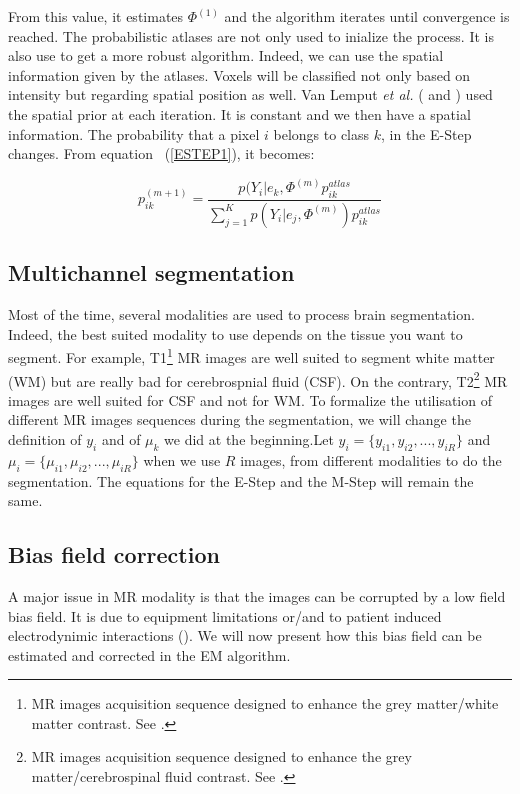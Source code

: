 From this value, it estimates $\Phi^{(1)}$ and the algorithm iterates until convergence is reached. The probabilistic atlases are not only used to inialize the process. It is also use to get a more robust algorithm. Indeed, we can use the spatial information given by the atlases. Voxels will be classified not only based on intensity but regarding spatial position as well. Van Lemput \textit{et al.} (\cite{8} and \cite{9}) used the spatial prior at each iteration. It is constant and we then have a spatial information. The probability that a pixel $i$ belongs to class $k$, in the E-Step changes. From equation ~(\ref{ESTEP1}), it becomes:

  \begin{equation*}\label{ESTEP2}
  p_{ik}^{(m+1)} = \frac{p(Y_i|e_k,\Phi^{(m)}p_{ik}^{atlas}}{\sum_{j=1}^K   p(Y_i|e_j,\Phi^{(m)}) p_{ik}^{atlas}}  
  \end{equation*}

%
\subsection{Multichannel segmentation}\label{multichannel}
Most of the time, several modalities are used to process brain segmentation. Indeed, the best suited modality to use depends on the tissue you want to segment. For example, T1\footnote{MR images acquisition sequence designed to enhance the grey matter/white matter contrast. See \cite{12}.} MR images are well suited to segment white matter (WM) but are really bad for cerebrospnial fluid (CSF). On the contrary, T2\footnote{MR images acquisition sequence designed to enhance the grey matter/cerebrospinal fluid contrast. See \cite{12}.} MR images are well suited for CSF and not for WM. To formalize the utilisation of different MR images sequences during the segmentation, we will change the definition of $y_i$ and of $\mu_k$ we did at the beginning.Let $y_i = \{y_{i1},y_{i2}, ..., y_{iR}\}$ and $\mu_i = \{\mu_{i1},\mu_{i2}, ..., \mu_{iR}\}$ when we use $R$ images, from different modalities to do the segmentation. The equations for the E-Step and the M-Step will remain the same.
%
\subsection{Bias field correction}\label{biasfield}
A major issue in MR modality is that the images can be corrupted by a low field bias field. It is due to equipment limitations or/and to patient induced electrodynimic interactions (\cite{12}). We will now present how this bias field can be estimated and corrected in the EM algorithm.
%
